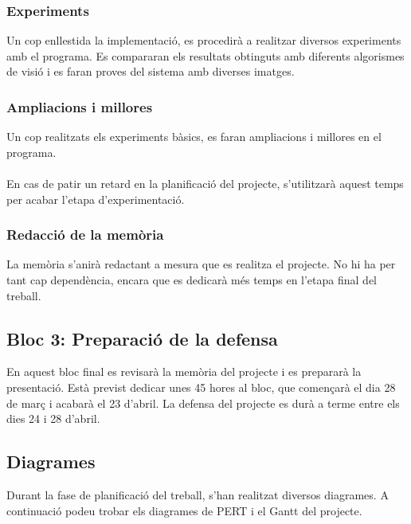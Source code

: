 		\subsubsection{Experiments}
			Un cop enllestida la implementació, es procedirà a realitzar diversos experiments amb el programa. Es compararan els resultats obtinguts amb diferents algorismes de visió i es faran
			proves del sistema amb diverses imatges.
		\subsubsection{Ampliacions i millores}
			Un cop realitzats els experiments bàsics, es faran ampliacions i millores en el programa.\\\\
			En cas de patir un retard en la planificació del projecte, s'utilitzarà aquest temps per acabar l'etapa d'experimentació.
		\subsubsection{Redacció de la memòria}
			La memòria s'anirà redactant a mesura que es realitza el projecte. No hi ha per tant cap dependència, encara que es dedicarà més temps en l'etapa final del treball.\\

	\subsection{Bloc 3: Preparació de la defensa}
	En aquest bloc final es revisarà la memòria del projecte i es prepararà la presentació. Està previst dedicar unes 45 hores al bloc, que començarà el dia 28 de març i acabarà el 23 d'abril.
	La defensa del projecte es durà a terme entre els dies 24 i 28 d'abril.

	\subsection{Diagrames}
		Durant la fase de planificació del treball, s'han realitzat diversos diagrames. A continuació podeu trobar els diagrames de PERT i el Gantt del projecte.\\

